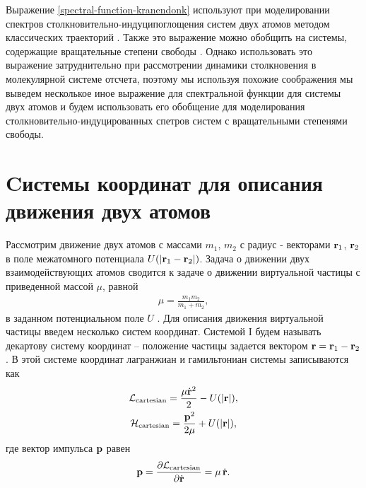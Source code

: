 Выражение \eqref{spectral-function-kranendonk} используют при моделировании спектров столкновительно-индуци поглощения систем двух атомов методом классических траекторий \cite{levine1967, mcquarrie1968, buryak2014}. Также это выражение можно обобщить на системы, содержащие вращательные степени свободы \cite{oparin2017}. Однако использовать это выражение затруднительно при рассмотрении динамики столкновения в молекулярной системе отсчета, поэтому мы используя похожие соображения мы выведем несколькое иное выражение для спектральной функции для системы двух атомов и будем использовать его обобщение для моделирования столкновительно-индуцированных спетров систем с вращательными степенями свободы.  

\section{Cистемы координат для описания движения двух атомов} \label{section:two-atom-coordinate-systems}

Рассмотрим движение двух атомов с массами $m_1$, $m_2$ с радиус - векторами $\mathbf{r}_1$, $\mathbf{r}_2$ в поле межатомного потенциала $U(\vert \mathbf{r}_1 - \mathbf{r}_2 \vert)$. Задача о движении двух взаимодействующих атомов сводится к задаче о движении виртуальной частицы с приведенной массой $\mu$,  равной 
\begin{gather}
    \mu = \frac{m_1 m_2}{m_1 + m_2}, 
\end{gather}
%
в заданном потенциальном поле $U$ \cite{landau-volume1}. Для описания движения виртуальной частицы введем несколько систем координат. Системой I будем называть декартову систему координат -- положение частицы задается вектором $\mathbf{r} = \mathbf{r}_1 - \mathbf{r}_2$. В этой системе координат лагранжиан и гамильтониан системы записываются как 
\begin{gather}
    \mathcal{L}_\text{cartesian} = \frac{\mu \dot{\mathbf{r}}^2}{2} - U( \vert \mathbf{r} \vert ), \label{two-atom-cartesian-lagrangian} \\
    \mathcal{H}_\text{cartesian} = \frac{\mathbf{p}^2}{2\mu} + U( \vert \mathbf{r} \vert ), \label{two-atom-cartesian-hamiltonian}
\end{gather}
%
где вектор импульса $\mathbf{p}$ равен
\begin{gather}
    \mathbf{p} = \frac{\partial \mathcal{L}_\text{cartesian}}{\partial \dot{\mathbf{r}}} = \mu \, \dot{\mathbf{r}}. \label{two-atom-cartesian-momenta}
\end{gather}

